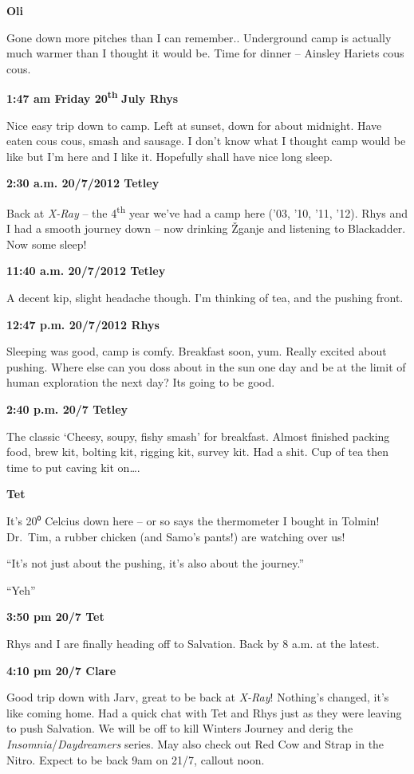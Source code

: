 \textbf{Oli}

Gone down more pitches than I can remember.. Underground camp is
actually much warmer than I thought it would be. Time for dinner --
Ainsley Hariets cous cous.

\textbf{1:47 am Friday 20\textsuperscript{th}} \textbf{July Rhys}

Nice easy trip down to camp. Left at sunset, down for about midnight.
Have eaten cous cous, smash and sausage. I don't know what I thought
camp would be like but I'm here and I like it. Hopefully shall have nice
long sleep.

\textbf{2:30 a.m. 20/7/2012 Tetley}

Back at \emph{X-Ray} -- the 4\textsuperscript{th} year we've had a camp
here ('03, '10, '11, '12). Rhys and I had a smooth journey down -- now
drinking Žganje and listening to Blackadder. Now some sleep!

\textbf{11:40 a.m. 20/7/2012 Tetley}

A decent kip, slight headache though. I'm thinking of tea, and the
pushing front.

\textbf{12:47 p.m. 20/7/2012 Rhys}

Sleeping was good, camp is comfy. Breakfast soon, yum. Really excited
about pushing. Where else can you doss about in the sun one day and be
at the limit of human exploration the next day? Its going to be good.

\textbf{2:40 p.m. 20/7 Tetley}

The classic `Cheesy, soupy, fishy smash' for breakfast. Almost finished
packing food, brew kit, bolting kit, rigging kit, survey kit. Had a
shit. Cup of tea then time to put caving kit on\ldots{}.

\textbf{Tet}

It's 20⁰ Celcius down here -- or so says the thermometer I bought in
Tolmin! Dr.~Tim, a rubber chicken (and Samo's pants!) are watching over
us!

``It's not just about the pushing, it's also about the journey.''

``Yeh''

\textbf{3:50 pm 20/7 Tet}

Rhys and I are finally heading off to Salvation. Back by 8 a.m. at the
latest.

\textbf{4:10 pm 20/7 Clare}

Good trip down with Jarv, great to be back at \emph{X-Ray}! Nothing's
changed, it's like coming home. Had a quick chat with Tet and Rhys just
as they were leaving to push Salvation. We will be off to kill Winters
Journey and derig the \emph{Insomnia}/\emph{Daydreamers} series. May
also check out Red Cow and Strap in the Nitro. Expect to be back 9am on
21/7, callout noon.

